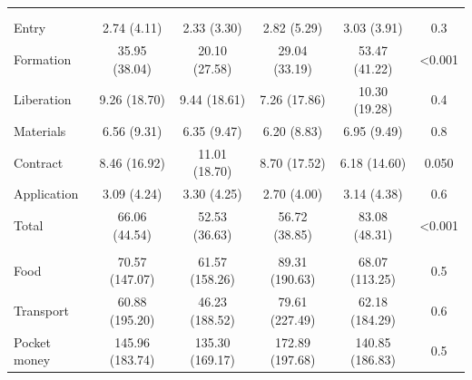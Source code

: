 \documentclass[
  a4paper, twoside, 12pt]{book}
\begin{document}
\begin{table}[H]
{\begin{threeparttable}
\begin{tabular}[t]{lccccc}
\addlinespace[0.3em]
\hline
\multicolumn{6}{l}{\textbf{Firm survey:}}\\
\addlinespace[0.3em]
\multicolumn{6}{l}{\hspace{1em} Fees}\\
\hspace{1em}\hspace{1em}Entry & 2.74 (4.11) & 2.33 (3.30) & 2.82 (5.29) & 3.03 (3.91) & 0.3\\
\hspace{1em}\hspace{1em}Formation & 35.95 (38.04) & 20.10 (27.58) & 29.04 (33.19) & 53.47 (41.22) & <0.001\\
\hspace{1em}\hspace{1em}Liberation & 9.26 (18.70) & 9.44 (18.61) & 7.26 (17.86) & 10.30 (19.28) & 0.4\\
\hspace{1em}\hspace{1em}Materials & 6.56 (9.31) & 6.35 (9.47) & 6.20 (8.83) & 6.95 (9.49) & 0.8\\
\hspace{1em}\hspace{1em}Contract & 8.46 (16.92) & 11.01 (18.70) & 8.70 (17.52) & 6.18 (14.60) & 0.050\\
\hspace{1em}\hspace{1em}Application & 3.09 (4.24) & 3.30 (4.25) & 2.70 (4.00) & 3.14 (4.38) & 0.6\\
\hspace{1em}\hspace{1em}Total & 66.06 (44.54) & 52.53 (36.63) & 56.72 (38.85) & 83.08 (48.31) & <0.001\\
\addlinespace[0.3em]
\multicolumn{6}{l}{\hspace{1em} Allowances}\\
\hspace{1em}\hspace{1em}Food & 70.57 (147.07) & 61.57 (158.26) & 89.31 (190.63) & 68.07 (113.25) & 0.5\\
\hspace{1em}\hspace{1em}Transport & 60.88 (195.20) & 46.23 (188.52) & 79.61 (227.49) & 62.18 (184.29) & 0.6\\
\hspace{1em}\hspace{1em}Pocket money & 145.96 (183.74) & 135.30 (169.17) & 172.89 (197.68) & 140.85 (186.83) & 0.5\\

\end{tabular}
\end{threeparttable}}
\end{table}
\end{document}

